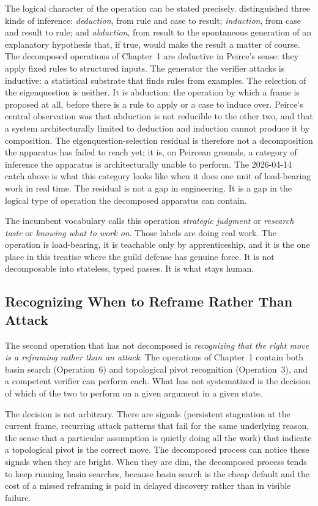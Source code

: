 \documentclass[11pt]{article}
\begin{document}
The logical character of the operation can be stated precisely. \citet{peirce1878} distinguished three kinds of inference: \emph{deduction}, from rule and case to result; \emph{induction}, from case and result to rule; and \emph{abduction}, from result to the spontaneous generation of an explanatory hypothesis that, if true, would make the result a matter of course. The decomposed operations of Chapter~1 are deductive in Peirce's sense: they apply fixed rules to structured inputs. The generator the verifier attacks is inductive: a statistical substrate that finds rules from examples. The selection of the eigenquestion is neither. It is abduction: the operation by which a frame is proposed at all, before there is a rule to apply or a case to induce over. Peirce's central observation was that abduction is not reducible to the other two, and that a system architecturally limited to deduction and induction cannot produce it by composition. The eigenquestion-selection residual is therefore not a decomposition the apparatus has failed to reach yet; it is, on Peircean grounds, a category of inference the apparatus is architecturally unable to perform. The 2026-04-14 catch above is what this category looks like when it does one unit of load-bearing work in real time. The residual is not a gap in engineering. It is a gap in the logical type of operation the decomposed apparatus can contain.

The incumbent vocabulary calls this operation \emph{strategic judgment} or \emph{research taste} or \emph{knowing what to work on}. Those labels are doing real work. The operation is load-bearing, it is teachable only by apprenticeship, and it is the one place in this treatise where the guild defense has genuine force. It is not decomposable into stateless, typed passes. It is what stays human.

\subsection{Recognizing When to Reframe Rather Than Attack}

The second operation that has not decomposed is \emph{recognizing that the right move is a reframing rather than an attack}. The operations of Chapter~1 contain both basin search (Operation~6) and topological pivot recognition (Operation~3), and a competent verifier can perform each. What has not systematized is the decision of which of the two to perform on a given argument in a given state.

The decision is not arbitrary. There are signals (persistent stagnation at the current frame, recurring attack patterns that fail for the same underlying reason, the sense that a particular assumption is quietly doing all the work) that indicate a topological pivot is the correct move. The decomposed process can notice these signals when they are bright. When they are dim, the decomposed process tends to keep running basin searches, because basin search is the cheap default and the cost of a missed reframing is paid in delayed discovery rather than in visible failure.
\end{document}
